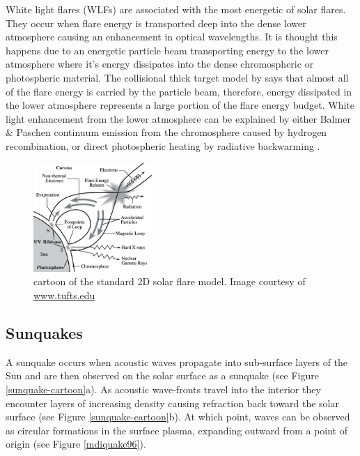 White light flares (WLFs) are associated with the most energetic of solar flares. They occur when flare energy is transported deep into the dense lower atmosphere causing an enhancement in optical wavelengths. It is thought this happens due to an energetic particle beam transporting energy to the lower atmosphere where it's energy dissipates into the dense chromospheric or photospheric material. The collisional thick target model by \cite{1971SoPh...18..489B} says that almost all of the flare energy is carried by the particle beam, therefore, energy dissipated in the lower atmosphere represents a large portion of the flare energy budget. White light enhancement from the lower atmosphere can be explained by either Balmer \& Paschen continuum emission from the chromosphere caused by hydrogen recombination, or direct photospheric heating \citep{2007ASPC..368..417D} by radiative backwarming \citep{1989SoPh..124..303M}.


\begin{figure}[H]
  \begin{center}
  \includegraphics[width=0.40\textwidth]{flare}
  \caption{cartoon of the standard 2D solar flare model. Image courtesy of \href{http://ase.tufts.edu/cosmos/print_images.asp?id=47}{www.tufts.edu}}\label{flare-cartoon}
\end{center}
\end{figure}





\subsection{Sunquakes}
A sunquake occurs when acoustic waves propagate into sub-surface layers of the Sun 
and are then observed on the solar surface as a sunquake (see Figure \ref{sunquake-cartoon}a). As acoustic wave-fronts travel into the interior they encounter layers of increasing density causing refraction back toward the solar surface (see Figure \ref{sunquake-cartoon}b). At which point, waves can be observed as circular formations in the surface plasma, expanding outward from a point of origin (see Figure \ref{mdiquake96}).


